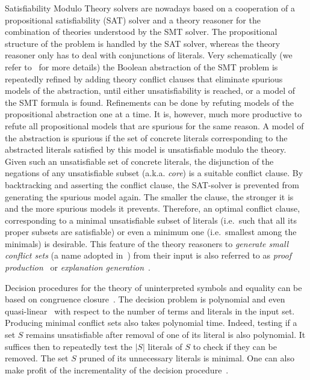 \documentclass{easychair}
\begin{document}
Satisfiability Modulo Theory solvers are nowadays based on a cooperation of a
propositional satisfiability (SAT) solver and a theory reasoner for the
combination of theories understood by the SMT solver. The propositional
structure of the problem is handled by the SAT solver, whereas the theory
reasoner only has to deal with conjunctions of literals.  Very schematically (we
refer to~\cite{Barrett14} for more details) the Boolean abstraction of the SMT
problem is repeatedly refined by adding theory conflict clauses that eliminate
spurious models of the abstraction, until either unsatisfiability is reached, or
a model of the SMT formula is found.  Refinements can be done by refuting models
of the propositional abstraction one at a time.  It is, however, much more
productive to refute all propositional models that are spurious for the same
reason.  A model of the abstraction is spurious if the set of concrete literals
corresponding to the abstracted literals satisfied by this model is
unsatisfiable modulo the theory.  Given such an unsatisfiable set of concrete literals, the
disjunction of the negations of any unsatisfiable subset (a.k.a. \emph{core}) is a suitable
conflict clause.  By backtracking and asserting the conflict clause, the
SAT-solver is prevented from generating the spurious model again. The smaller
the clause, the stronger it is and the more spurious models it prevents.
Therefore, an optimal conflict clause, corresponding to a minimal unsatisfiable
subset of literals (i.e.\ such that all its proper subsets are satisfiable) or
even a minimum one (i.e.\ smallest among the minimals) is desirable.  This
feature of the theory reasoners to \emph{generate small conflict sets} (a name
adopted in~\cite{Barrett14}) from their input is also referred to as \emph{proof
production}~\cite{Nieuwenhuis3,Nieuwenhuis9} or \emph{explanation
generation}~\cite{Nieuwenhuis6}.

Decision procedures for the theory of uninterpreted symbols and equality can be
based on congruence closure~\cite{Nelson2,Downey1,Nieuwenhuis6}.  The decision problem is polynomial
and even quasi-linear~\cite{Downey1} with respect to the number of terms and
literals in the input set.  Producing minimal conflict sets also takes
polynomial time.  Indeed, testing if a set $S$ remains unsatisfiable after
removal of one of its literal is also polynomial.  It suffices then to
repeatedly test the $|S|$ literals of $S$ to check if they can be removed.  The
set $S$ pruned of its unnecessary literals is minimal.  One can also make profit of the incrementality of the decision procedure~\cite{Fontaine1}.
\end{document}

